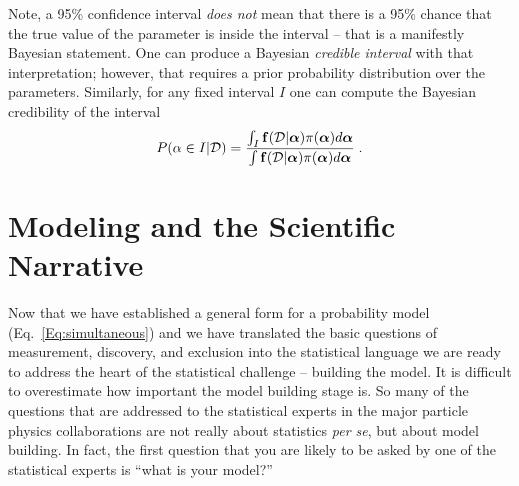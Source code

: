 \documentclass{cernrep}
\def\vec#1{\ifmmode
\mathchoice{\mbox{\boldmath$\displaystyle\bf#1$}}
{\mbox{\boldmath$\textstyle\bf#1$}}
{\mbox{\boldmath$\scriptstyle\bf#1$}}
{\mbox{\boldmath$\scriptscriptstyle\bf#1$}}\else
{\mbox{\boldmath$\bf#1$}}\fi}
\newcommand{\data}{{\ensuremath{\mathcal{D}}}}
\newcommand{\f}{{\ensuremath{\mathbf{f}}}}
\begin{document}
Note, a 95\% confidence interval \textit{does not} mean that there is a 95\% chance that the true value of the parameter is inside the interval -- that is a manifestly Bayesian statement.  One can produce a Bayesian \textit{credible interval} with that interpretation; however, that requires a prior probability distribution over the parameters.  Similarly, for any fixed interval $I$ one can compute the Bayesian credibility of the interval 
\begin{equation}
\label{eq:credible}
P(\alpha\in I | \data) = \frac{ \int_{I}  \f(\data | \vec\alpha) \pi(\vec\alpha) d\vec\alpha }{\int \f(\data | \vec\alpha) \pi(\vec\alpha) d\vec\alpha} \;.
\end{equation}


\section{Modeling and the Scientific Narrative}

Now that we have established a general form for a probability model (Eq.~\ref{Eq:simultaneous}) and we have translated the basic questions of measurement, discovery, and exclusion into the statistical language we are ready to address the heart of the statistical challenge -- building the model.  It is difficult to overestimate how important the model building stage is.  So many of the questions that are addressed to the statistical experts in the major particle physics collaborations are not really about statistics \textit{per se}, but about model building.  In fact, the first question that you are likely to be asked by one of the statistical experts is ``what is your model?'' 

\end{document}
